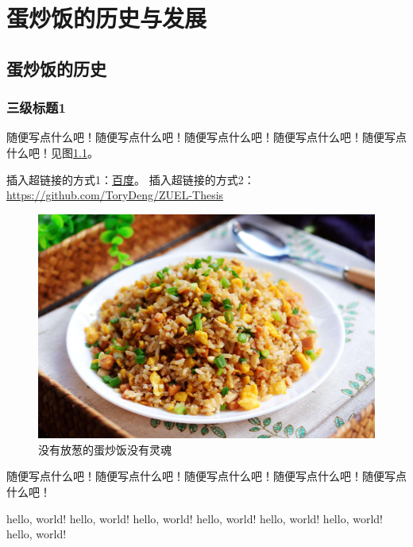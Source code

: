 \chapter{蛋炒饭的历史与发展}
\section{蛋炒饭的历史}
\subsection{三级标题1}
随便写点什么吧！随便写点什么吧！随便写点什么吧！随便写点什么吧！随便写点什么吧！见图\ref{fig:my_label}。

插入超链接的方式1：\href{http://www.baidu.com}{百度}。
插入超链接的方式2：\url{https://github.com/ToryDeng/ZUEL-Thesis}

\begin{figure}[h]
    \centering
    \includegraphics[scale=0.1]{imgs/蛋炒饭.jpeg}
    \caption{没有放葱的蛋炒饭没有灵魂}
    \label{fig:my_label}
\end{figure}

随便写点什么吧！随便写点什么吧！随便写点什么吧！随便写点什么吧！随便写点什么吧！

hello, world! hello, world! hello, world! hello, world! hello, world! hello, world! hello, world!